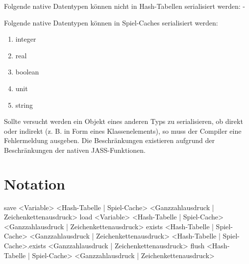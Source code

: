 Folgende native Datentypen können nicht in Hash-Tabellen serialisiert werden:
-

Folgende native Datentypen können in Spiel-Caches serialisiert werden:
\begin{enumerate}
\item integer
\item real
\item boolean
\item unit
\item string
\end{enumerate}

Sollte versucht werden ein Objekt eines anderen Typs zu serialisieren, ob direkt oder indirekt (z. B. in Form eines Klassenelements), so muss der Compiler eine Fehlermeldung ausgeben.
Die Beschränkungen existieren aufgrund der Beschränkungen der nativen JASS-Funktionen.

\section{Notation}
save <Variable> <Hash-Tabelle | Spiel-Cache> <Ganzzahlausdruck | Zeichenkettenausdruck>
load <Variable> <Hash-Tabelle | Spiel-Cache> <Ganzzahlausdruck | Zeichenkettenausdruck>
exists <Hash-Tabelle | Spiel-Cache> <Ganzzahlausdruck | Zeichenkettenausdruck>
<Hash-Tabelle | Spiel-Cache>.exists <Ganzzahlausdruck | Zeichenkettenausdruck>
flush <Hash-Tabelle | Spiel-Cache> <Ganzzahlausdruck | Zeichenkettenausdruck>
